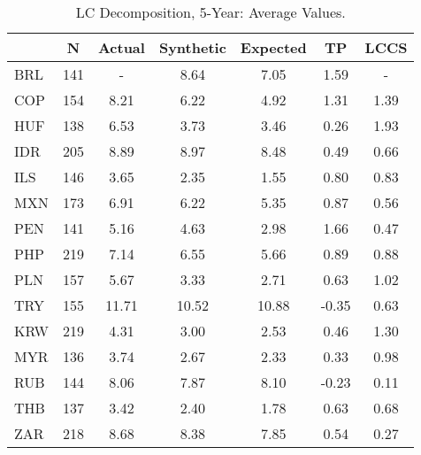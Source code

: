 \begin{tiny}\begin{table}\centering\begin{tabular}{l|cccccc}\toprule & N & Actual & Synthetic & Expected & TP & LCCS \\\midrule BRL & 141 & - & 8.64 & 7.05 & 1.59 & - \\COP & 154 & 8.21 & 6.22 & 4.92 & 1.31 & 1.39 \\HUF & 138 & 6.53 & 3.73 & 3.46 & 0.26 & 1.93 \\IDR & 205 & 8.89 & 8.97 & 8.48 & 0.49 & 0.66 \\ILS & 146 & 3.65 & 2.35 & 1.55 & 0.80 & 0.83 \\MXN & 173 & 6.91 & 6.22 & 5.35 & 0.87 & 0.56 \\PEN & 141 & 5.16 & 4.63 & 2.98 & 1.66 & 0.47 \\PHP & 219 & 7.14 & 6.55 & 5.66 & 0.89 & 0.88 \\PLN & 157 & 5.67 & 3.33 & 2.71 & 0.63 & 1.02 \\TRY & 155 & 11.71 & 10.52 & 10.88 & -0.35 & 0.63 \\KRW & 219 & 4.31 & 3.00 & 2.53 & 0.46 & 1.30 \\MYR & 136 & 3.74 & 2.67 & 2.33 & 0.33 & 0.98 \\RUB & 144 & 8.06 & 7.87 & 8.10 & -0.23 & 0.11 \\THB & 137 & 3.42 & 2.40 & 1.78 & 0.63 & 0.68 \\ZAR & 218 & 8.68 & 8.38 & 7.85 & 0.54 & 0.27 \\\bottomrule\end{tabular}\caption{LC Decomposition, 5-Year: Average Values.}\label{table:Decomp5yr}\end{table}\end{tiny}
